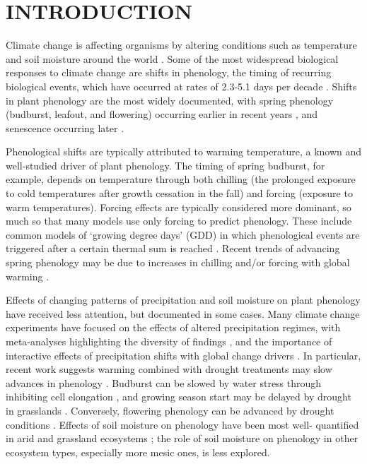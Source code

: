 \documentclass{article}
\begin{document}
\newpage
\section* {INTRODUCTION} 
\par Climate change is affecting organisms by altering conditions such as temperature and soil moisture around the world \citep{parmesan2006,chen2011}. Some of the most widespread biological responses to climate change are shifts in phenology, the timing of recurring biological events, which have occurred at rates of 2.3-5.1 days per decade \citep{parmesan2006,poloczanska2013,root2003}. Shifts in plant phenology are the most widely documented, with spring phenology (budburst, leafout, and flowering) occurring earlier in recent years \citep{wolkovich2012}, and senescence occurring later \citep{taylor2008,delpierre2009}. 
\par Phenological shifts are typically attributed to warming temperature, a known and well-studied driver of plant phenology. The timing of spring budburst, for example, depends on temperature through both chilling (the prolonged exposure to cold temperatures after growth cessation in the fall) and forcing (exposure to warm temperatures). Forcing effects are typically considered more dominant, so much so that many models use only forcing to predict phenology. These include common models of `growing degree days' (GDD) in which phenological events are triggered after a certain thermal sum is reached \citep[e.g., ][]{olsson2014process}. Recent trends of advancing spring phenology may be due to increases in chilling and/or forcing with global warming \citep{fujisawa2010, ibanez2010,cook2012b}. %

\par Effects of changing patterns of precipitation and soil moisture on plant phenology have received less attention, but documented in some cases. Many climate change experiments have focused on the effects of altered precipitation regimes, with meta-analyses highlighting the diversity of findings \citep{lu2023contrasting}, and the importance of interactive effects of precipitation shifts with global change drivers \citep{zhou2023climate}. In particular, recent work suggests warming combined with drought treatments may slow advances in phenology \citep{zhou2023climate}. Budburst can be slowed by water stress through inhibiting cell elongation \citep{essiamah1986}, and growing season start may be delayed by drought in grasslands \cite{cui2017}. Conversely, flowering phenology can be advanced by drought conditions \citep{hamann2018}. Effects of soil moisture on phenology have been most well- quantified in arid and grassland ecosystems \citep[e.g., ][]{essiamah1986,reich1984, van1993, tao2019}; the role of soil moisture on phenology in other ecosystem types, especially more mesic ones, is less explored. 
\end{document}
